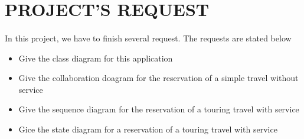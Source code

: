 \section{PROJECT'S REQUEST}

\paragraph{}
In this project, we have to finish several request. The requests are stated below

\begin{itemize}
\item Give the class diagram for this application
\item Give the collaboration doagram for the reservation of a simple travel without service
\item Give the sequence diagram for the reservation of a touring travel with service
\item Gice the state diagram for a reservation of a touring travel with service
\end{itemize}


\newpage


\newpage


\newpage


\newpage
